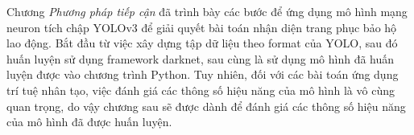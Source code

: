 \begin{enumerate}
\noindent{}

\end{enumerate}

Chương \emph{Phương pháp tiếp cận} đã trình bày các bước để ứng dụng mô hình mạng neuron tích chập YOLOv3 để giải quyết bài toán nhận diện trang phục bảo hộ lao động. Bắt đầu từ việc xây dựng tập dữ liệu theo format của YOLO, sau đó huấn luyện sử dụng framework darknet, sau cùng là sử dụng mô hình đã huấn luyện được vào chương trình Python. Tuy nhiên, đối với các bài toán ứng dụng trí tuệ nhân tạo, việc đánh giá các thông số hiệu năng của mô hình là vô cùng quan trọng, do vậy chương sau sẽ được dành để đánh giá các thông số hiệu năng của mô hình đã được huấn luyện.